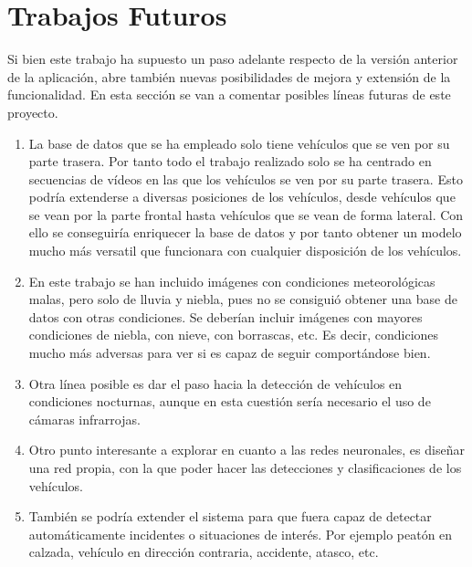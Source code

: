 \section{Trabajos Futuros}

Si bien este trabajo ha supuesto un paso adelante respecto de la versión anterior de la aplicación, abre también nuevas posibilidades de mejora y extensión de la funcionalidad. En esta sección se van a comentar posibles líneas futuras de este proyecto.

\begin{enumerate}
    \item La base de datos que se ha empleado solo tiene vehículos que se ven por su parte trasera. Por tanto todo el trabajo realizado solo se ha centrado en secuencias de vídeos en las que los vehículos se ven por su parte trasera. Esto podría extenderse a diversas posiciones de los vehículos, desde vehículos que se vean por la parte frontal hasta vehículos que se vean de forma lateral. Con ello se conseguiría enriquecer la base de  datos y por tanto obtener un modelo mucho más versatil que funcionara con cualquier disposición de los vehículos.
    \item En este trabajo se han incluido imágenes con condiciones meteorológicas malas, pero solo de lluvia y niebla, pues no se consiguió obtener una base de datos con otras condiciones. Se deberían incluir imágenes con mayores condiciones de niebla, con nieve, con borrascas, etc. Es decir, condiciones mucho más adversas para ver si es capaz de seguir comportándose bien.
    \item Otra línea posible es dar el paso hacia la detección de vehículos en condiciones nocturnas, aunque en esta cuestión sería necesario el uso de cámaras infrarrojas.
    \item Otro punto interesante a explorar en cuanto a las redes neuronales, es diseñar una red propia, con la que poder hacer las detecciones y clasificaciones de los vehículos.
    \item También se podría extender el sistema para que fuera capaz de detectar automáticamente incidentes o situaciones de interés. Por ejemplo peatón en calzada, vehículo en dirección contraria, accidente, atasco, etc.
\end{enumerate}{}
